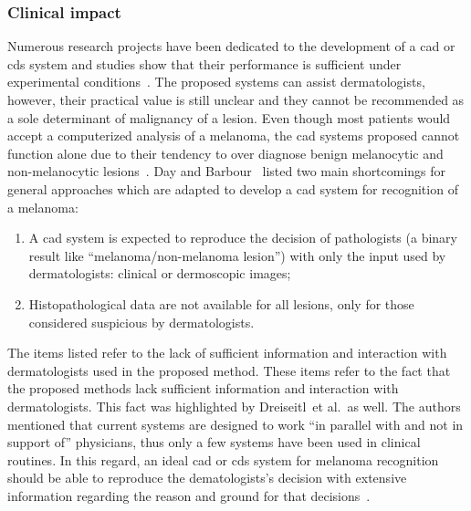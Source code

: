 \subsubsection{Clinical impact}
Numerous research projects have been dedicated to the development of a \ac{cad} or \ac{cds} system and studies show that their performance is sufficient under experimental conditions~\cite{Fruhauf2012}. 
The proposed systems can assist dermatologists, however, their practical value is still unclear and they cannot be recommended as a sole determinant of malignancy of a lesion.
Even though most patients would accept a computerized analysis of a melanoma, the \ac{cad} systems proposed cannot function alone due to their tendency to over diagnose benign melanocytic and non-melanocytic lesions~\cite{Fruhauf2012}.
Day and Barbour~\cite{Day2001} listed two main shortcomings for general approaches which are adapted to develop a \ac{cad} system for recognition of a melanoma:
\begin{enumerate}
\item A \ac{cad} system is expected to reproduce the decision of pathologists (a binary result like ``melanoma/non-melanoma lesion'') with only the input used by dermatologists: clinical or dermoscopic images;
\item Histopathological data are not available for all lesions, only for those considered suspicious by dermatologists.
\end{enumerate}
\noindent
The items listed refer to the lack of sufficient information and interaction with dermatologists used in the proposed method.
These items refer to the fact that the proposed methods lack sufficient information and interaction with dermatologists.
This fact was highlighted by Dreiseitl~et al.\,\cite{Dreiseitl2005} as well. 
The authors mentioned that current systems are designed to work ``in parallel with and not in support of'' physicians, thus only a few systems have been used in clinical routines.
In this regard, an ideal \ac{cad} or \ac{cds} system for melanoma recognition should be able to reproduce the dematologists's decision with extensive information regarding the reason and ground for that decisions~\cite{Dreiseitl2005}.

